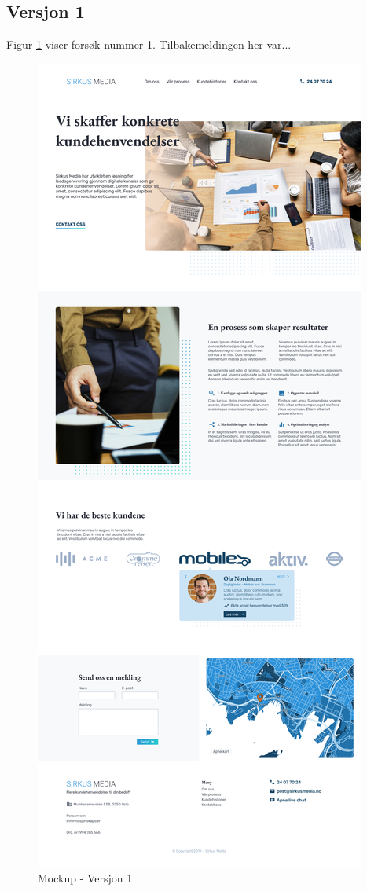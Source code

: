\subsection{Versjon 1}
Figur \ref{fig:mockup-v1} viser forsøk nummer 1. Tilbakemeldingen her var...
\begin{figure}[H]
    \centering
    \includegraphics[height=\textheight]{mockup1-draft3.png}
    \caption{Mockup - Versjon 1}
    \label{fig:mockup-v1}
\end{figure}


